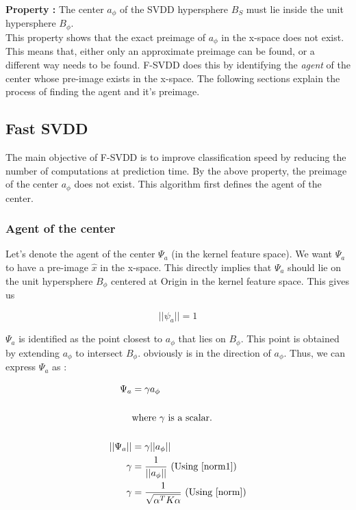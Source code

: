 \documentclass{article} %
\begin{document}
\textbf{Property :} The center $a_\phi$ of the SVDD hypersphere $B_S$ must lie inside the unit hypersphere $B_{\phi}$. \\[10pt]


This property shows that the exact preimage of $a_\phi$ in the x-space does not exist. This means that, either only an approximate preimage can be found, or a different way needs to be found. F-SVDD does this by identifying the \textit{agent} of the center whose pre-image exists in the x-space. The following sections explain the process of finding the agent and it's preimage.


\subsection{Fast SVDD}
The main objective of F-SVDD is to improve classification speed by reducing the number of computations at prediction time. By the above property, the preimage of the center $a_\phi$ does not exist. This algorithm  first defines the agent of the center.

\subsubsection*{Agent of the center}

Let's denote the agent of the center $\Psi_a$ (in the kernel feature space). We want $\Psi_a$ to have a pre-image $\hat{x}$ in the x-space.  This directly implies that $\Psi_a$ should lie on the unit hypersphere  $B_{\phi}$ centered at Origin in the kernel feature space. This gives us  

\begin{equation}\label{norm1}
||\psi_a|| = 1 
\end{equation}

$\Psi_a$ is identified as the point closest to $a_\phi$ that lies on $B_{\phi}$. This point is obtained by  extending $a_\phi$ to intersect $B_\phi$. obviously is in the direction of $a_\phi$.
Thus, we can express $\Psi_a$ as :

\begin{equation}
\begin{split}
\Psi_a &= \gamma a_\phi \\\\
&\text{where } \gamma  \text{ is a scalar.} \\ \\
||\Psi_a|| &= \gamma ||a_\phi||  \\
\gamma &= \frac{1}{||a_\phi||}  \text{  (Using  \ref{norm1})} \\ 
\gamma &= \frac{1}{\sqrt{\alpha^T K \alpha}} \text{  (Using  \ref{norm})} 
\end{split}
\end{equation}
\end{document}
